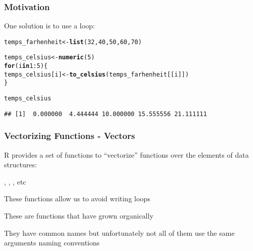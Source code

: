 \documentclass[12pt]{beamer}\usepackage[]{graphicx}\usepackage[]{color}
\makeatletter
\newcommand{\hlnum}[1]{\textcolor[rgb]{0.686,0.059,0.569}{#1}}%
\newcommand{\hlopt}[1]{\textcolor[rgb]{0,0,0}{#1}}%
\newcommand{\hlstd}[1]{\textcolor[rgb]{0.345,0.345,0.345}{#1}}%
\newcommand{\hlkwa}[1]{\textcolor[rgb]{0.161,0.373,0.58}{\textbf{#1}}}%
\newcommand{\hlkwb}[1]{\textcolor[rgb]{0.69,0.353,0.396}{#1}}%
\newcommand{\hlkwd}[1]{\textcolor[rgb]{0.737,0.353,0.396}{\textbf{#1}}}%
\newenvironment{kframe}{%
 \def\at@end@of@kframe{}%
 \ifinner\ifhmode%
  \def\at@end@of@kframe{\end{minipage}}%
  \begin{minipage}{\columnwidth}%
 \fi\fi%
 \def\FrameCommand##1{\hskip\@totalleftmargin \hskip-\fboxsep
 \colorbox{shadecolor}{##1}\hskip-\fboxsep
     \hskip-\linewidth \hskip-\@totalleftmargin \hskip\columnwidth}%
 \MakeFramed {\advance\hsize-\width
   \@totalleftmargin\z@ \linewidth\hsize
   \@setminipage}}%
 {\par\unskip\endMakeFramed%
 \at@end@of@kframe}
\newenvironment{knitrout}{}{} %
\makeatother
\begin{document}

\begin{frame}[fragile]
\frametitle{Motivation}

One solution is to use a {\hilit {}} loop:
\begin{knitrout}\footnotesize
{}\color{fgcolor}\begin{kframe}
\begin{alltt}
\hlstd{temps_farhenheit} \hlkwb{<-} \hlkwd{list}\hlstd{(}\hlnum{32}\hlstd{,} \hlnum{40}\hlstd{,} \hlnum{50}\hlstd{,} \hlnum{60}\hlstd{,} \hlnum{70}\hlstd{)}

\hlstd{temps_celsius} \hlkwb{<-} \hlkwd{numeric}\hlstd{(}\hlnum{5}\hlstd{)}
\hlkwa{for} \hlstd{(i} \hlkwa{in} \hlnum{1}\hlopt{:}\hlnum{5}\hlstd{) \{}
  \hlstd{temps_celsius[i]} \hlkwb{<-} \hlkwd{to_celsius}\hlstd{(temps_farhenheit[[i]])}
\hlstd{\}}

\hlstd{temps_celsius}
\end{alltt}
\begin{verbatim}
## [1]  0.000000  4.444444 10.000000 15.555556 21.111111
\end{verbatim}
\end{kframe}
\end{knitrout}

\end{frame}


\begin{frame}[fragile]
\frametitle{Vectorizing Functions - Vectors}

\bbi
  \item R provides a set of functions to ``vectorize'' functions over the elements of data structures:
  \bi
    \item {}, , , etc
  \ei
  \item These functions allow us to avoid writing loops
  \item These are functions that have grown organically
  \item They have common names but unfortunately not all of them use the same arguments naming conventions
\ei

\end{frame}


\begin{frame}
\begin{center}
\Huge{}
\end{center}
\end{frame}
\end{document}
